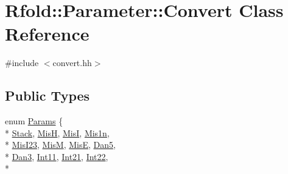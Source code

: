 \hypertarget{class_rfold_1_1_parameter_1_1_convert}{\section{Rfold\+:\+:Parameter\+:\+:Convert Class Reference}
\label{class_rfold_1_1_parameter_1_1_convert}
}


{\ttfamily \#include $<$convert.\+hh$>$}

\subsection*{Public Types}
\begin{DoxyCompactItemize}
\item 
enum \hyperlink{class_rfold_1_1_parameter_1_1_convert_a65137d7d6c3c2c5e4707db094885aa5f}{Params} \{ \\*
\hyperlink{class_rfold_1_1_parameter_1_1_convert_a65137d7d6c3c2c5e4707db094885aa5fad14720ea8a4141cd0b3426339cc4bf2c}{Stack}, 
\hyperlink{class_rfold_1_1_parameter_1_1_convert_a65137d7d6c3c2c5e4707db094885aa5fa85e54dd4019177b6dbbb33c61fbf9e6f}{Mis\+H}, 
\hyperlink{class_rfold_1_1_parameter_1_1_convert_a65137d7d6c3c2c5e4707db094885aa5fa48154a64d3263b296e732009603c3b6d}{Mis\+I}, 
\hyperlink{class_rfold_1_1_parameter_1_1_convert_a65137d7d6c3c2c5e4707db094885aa5fa15af076dcfc2c45bf295253b9024915c}{Mis1n}, 
\\*
\hyperlink{class_rfold_1_1_parameter_1_1_convert_a65137d7d6c3c2c5e4707db094885aa5fab1bf7b1d9648778a4d35353d6d0e64d5}{Mis\+I23}, 
\hyperlink{class_rfold_1_1_parameter_1_1_convert_a65137d7d6c3c2c5e4707db094885aa5fa6ab919fdff8fe5b54107d754d7a84d75}{Mis\+M}, 
\hyperlink{class_rfold_1_1_parameter_1_1_convert_a65137d7d6c3c2c5e4707db094885aa5fad6e1080f58ebd9f9d6d07e12148e26c5}{Mis\+E}, 
\hyperlink{class_rfold_1_1_parameter_1_1_convert_a65137d7d6c3c2c5e4707db094885aa5fa40972c1e65a95283b3278df556158420}{Dan5}, 
\\*
\hyperlink{class_rfold_1_1_parameter_1_1_convert_a65137d7d6c3c2c5e4707db094885aa5fa558313064a8c769145502ed504d7be62}{Dan3}, 
\hyperlink{class_rfold_1_1_parameter_1_1_convert_a65137d7d6c3c2c5e4707db094885aa5fae64e1426daa937b9d9cd4ceb2895c123}{Int11}, 
\hyperlink{class_rfold_1_1_parameter_1_1_convert_a65137d7d6c3c2c5e4707db094885aa5fa3fc52832506b505e872243be9f8716af}{Int21}, 
\hyperlink{class_rfold_1_1_parameter_1_1_convert_a65137d7d6c3c2c5e4707db094885aa5fa6544ef90a5614af2a75167dc837ee7b3}{Int22}, 
\\*

\end{DoxyCompactItemize}
